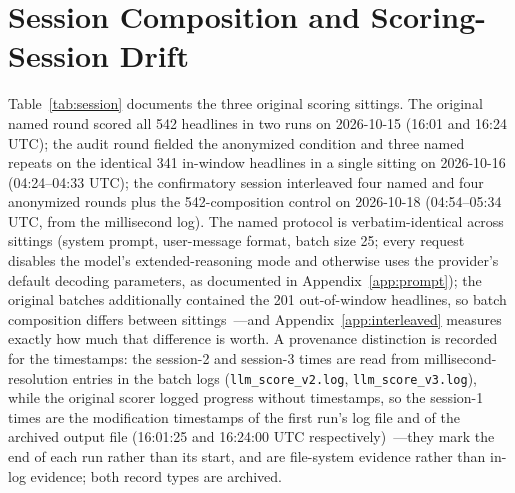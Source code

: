 \section{Session Composition and Scoring-Session Drift}\label{app:session}

Table~\ref{tab:session} documents the three original scoring sittings. The original named round scored all 542 headlines in two runs on 2026-10-15 (16:01 and 16:24 UTC); the audit round fielded the anonymized condition and three named repeats on the identical 341 in-window headlines in a single sitting on 2026-10-16 (04:24--04:33 UTC); the confirmatory session interleaved four named and four anonymized rounds plus the 542-composition control on 2026-10-18 (04:54--05:34 UTC, from the millisecond log). The named protocol is verbatim-identical across sittings (system prompt, user-message format, batch size 25; every request disables the model's extended-reasoning mode and otherwise uses the provider's default decoding parameters, as documented in Appendix~\ref{app:prompt}); the original batches additionally contained the 201 out-of-window headlines, so batch composition differs between sittings~---and Appendix~\ref{app:interleaved} measures exactly how much that difference is worth. A provenance distinction is recorded for the timestamps: the session-2 and session-3 times are read from millisecond-resolution entries in the batch logs (\texttt{llm\_score\_v2.log}, \texttt{llm\_score\_v3.log}), while the original scorer logged progress without timestamps, so the session-1 times are the modification timestamps of the first run's log file and of the archived output file (16:01:25 and 16:24:00 UTC respectively)~---they mark the end of each run rather than its start, and are file-system evidence rather than in-log evidence; both record types are archived.

